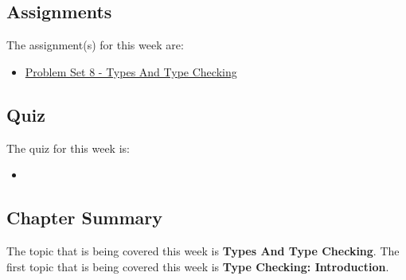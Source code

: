 \subsection{Assignments}

The assignment(s) for this week are:

\begin{itemize}
    \item \href{https://github.com/QuantumCompiler/CU/tree/main/CSPB%203155%20-%20Principles%20Of%20Programming%20Languages/Assignments/Problem%20Sets/Problem%20Set%208%20-%20Types%20And%20Type%20Checking}{Problem Set 8 - Types And Type Checking}
\end{itemize}

\subsection{Quiz}

The quiz for this week is:

\begin{itemize}
    \item {}
\end{itemize}

\newpage

\subsection{Chapter Summary}

The topic that is being covered this week is \textbf{Types And Type Checking}. The first topic that is being covered this week is \textbf{Type Checking: Introduction}.

